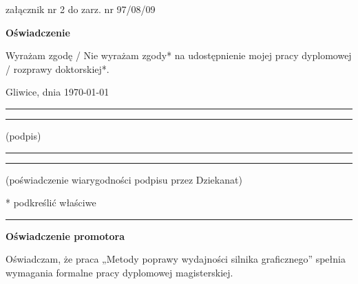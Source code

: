 \documentclass[a4paper,twoside,12pt]{book}
\newcommand{\tytul}{Metody poprawy wydajności silnika graficznego}
\begin{document}
\rmfamily
\normalfont
{
\cleardoublepage

\begin{flushright}
załącznik nr 2 do zarz. nr 97/08/09 
\end{flushright}

\vfill  

\begin{center}
\Large\bfseries Oświadczenie
\end{center}

\vfill

Wyrażam  zgodę / Nie wyrażam zgody*  na  udostępnienie  mojej  pracy  dyplomowej / rozprawy doktorskiej*.

\vfill

Gliwice, dnia \today

\vfill

\rule{0.5\textwidth}{0cm}\dotfill 

\rule{0.5\textwidth}{0cm}
\begin{minipage}{0.45\textwidth}
{\begin{center}(podpis)\end{center}}
\end{minipage} 

\vfill

\rule{0.5\textwidth}{0cm}\dotfill 

\rule{0.5\textwidth}{0cm}
\begin{minipage}{0.45\textwidth}
{\begin{center}\rule{0mm}{5mm}(poświadczenie wiarygodności podpisu przez Dziekanat)\end{center}}
\end{minipage}


\vfill

* podkreślić właściwe

 


\cleardoublepage

\rule{1cm}{0cm}

\vfill  

\begin{center}
\Large\bfseries Oświadczenie promotora
\end{center}

\vfill

Oświadczam, że praca „\tytul” spełnia wymagania formalne pracy dyplomowej magisterskiej.

}
\end{document}
